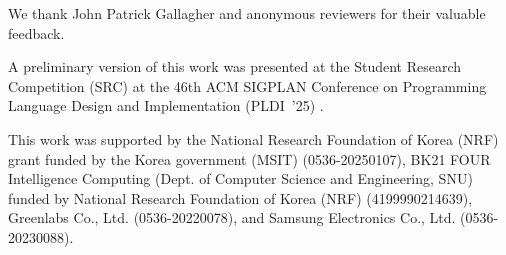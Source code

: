 \documentclass[sigplan,screen]{acmart}
\begin{document}
\begin{acks}
We thank John Patrick Gallagher and anonymous reviewers for their valuable feedback.

A preliminary version of this work was presented at the Student Research Competition (SRC) at the 46th ACM SIGPLAN Conference on Programming Language Design and Implementation (PLDI~'25) \citep{Lee25Retargeting}.

This work was supported by  the National Research Foundation of Korea (NRF) grant funded by the Korea government (MSIT) (0536-20250107), BK21 FOUR Intelligence Computing (Dept. of Computer Science and Engineering, SNU) funded by National Research Foundation of Korea (NRF) (4199990214639), Greenlabs Co., Ltd. (0536-20220078), and Samsung Electronics Co., Ltd. (0536-20230088).
\end{acks}



\end{document}
